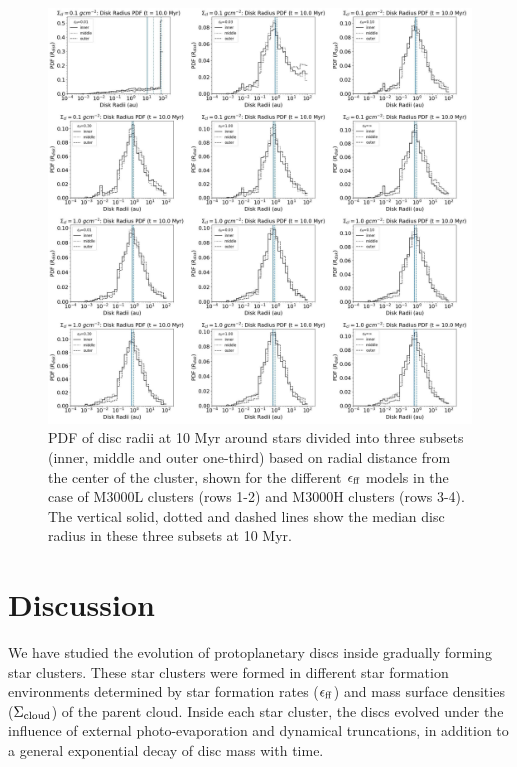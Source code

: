 \documentclass[fleqn,usenatbib]{mnras}
\newcommand\sfeff{\ensuremath{\epsilon_{\rm ff}}\xspace}   %
\newcommand\Sigmacloud{\ensuremath{\Sigma_{\rm cloud}}\xspace} %
\begin{document}
\begin{figure}%
    \centering
    \includegraphics[width=\textwidth]{figures/RadialProfile_DiscRadius.pdf}
    \caption{PDF of disc radii at 10 Myr around stars divided into three subsets (inner, middle and outer one-third) based on radial distance from the center of the cluster, shown for the different \sfeff models in the case of M3000L clusters (rows 1-2) and M3000H clusters (rows 3-4). The vertical solid, dotted and dashed lines show the median disc radius in these three subsets at 10 Myr.}
    \label{fig:radialprofilediskradius}
\end{figure}

\section{Discussion}
\label{sec:discussion}
We have studied the evolution of protoplanetary discs inside gradually forming star clusters. These star clusters were formed in different star formation environments determined by star formation rates (\sfeff) and mass surface densities (\Sigmacloud) of the parent cloud. Inside each star cluster, the discs evolved under the influence of external photo-evaporation and dynamical truncations, in addition to a general exponential decay of disc mass with time.  
\end{document}
